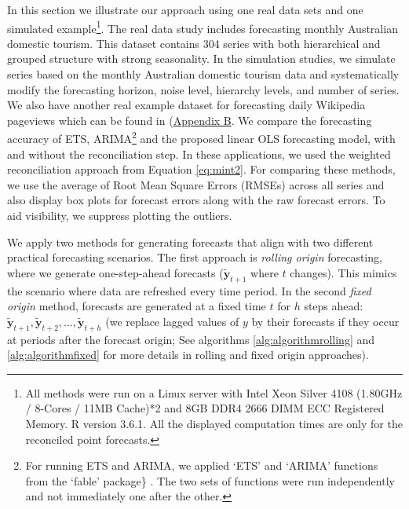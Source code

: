 \documentclass[11pt,a4paper,]{article}
\begin{document}
In this section we illustrate our approach using one real data sets and one simulated example\footnote{All methods were run on a Linux server with Intel Xeon Silver 4108 (1.80GHz / 8-Cores / 11MB Cache)*2 and 8GB DDR4 2666 DIMM ECC Registered Memory. R version 3.6.1. All the displayed computation times are only for the reconciled point forecasts.}. The real data study includes forecasting monthly Australian domestic tourism. This dataset contains 304 series with both hierarchical and grouped structure with strong seasonality. In the simulation studies, we simulate series based on the monthly Australian domestic tourism data and systematically modify the forecasting horizon, noise level, hierarchy levels, and number of series. We also have another real example dataset for forecasting daily Wikipedia pageviews which can be found in (\protect\hyperlink{appendixB}{Appendix B}. We compare the forecasting accuracy of ETS, ARIMA\footnote{For running ETS and ARIMA, we applied `ETS' and `ARIMA' functions from the `fable' package\} \autocite{o2019fable}. The two sets of functions were run independently and not immediately one after the other.} and the proposed linear OLS forecasting model, with and without the reconciliation step. In these applications, we used the weighted reconciliation approach from Equation \eqref{eq:mint2}. For comparing these methods, we use the average of Root Mean Square Errors (RMSEs) across all series and also display box plots for forecast errors along with the raw forecast errors. To aid visibility, we suppress plotting the outliers.

We apply two methods for generating forecasts that align with two different practical forecasting scenarios. The first approach is \emph{rolling origin} forecasting, where we generate one-step-ahead forecasts (\(\tilde{\bm{y}}_{t+1}\) where \(t\) changes). This mimics the scenario where data are refreshed every time period. In the second \emph{fixed origin} method, forecasts are generated at a fixed time \(t\) for \(h\) steps ahead: \(\tilde{\bm{y}}_{t+1}, \tilde{\bm{y}}_{t+2},\dots, \tilde{\bm{y}}_{t+h}\) (we replace lagged values of \(y\) by their forecasts if they occur at periods after the forecast origin; See algorithms \ref{alg:algorithmrolling} and \ref{alg:algorithmfixed} for more details in rolling and fixed origin approaches).
\end{document}
